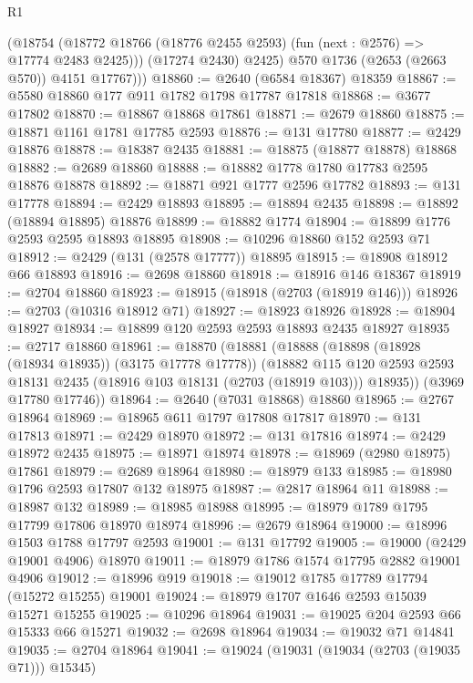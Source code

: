 \begin{lexlean}{R1}
\begin{coremodule}
            (@18754 (@18772 @18766 (@18776 @2455 @2593) (fun (next : @2576) => @17774 @2483 @2425)))
            (@17274 @2430)
            @2425)
          @570
          @1736
          (@2653 (@2663 @570))
          @4151
          @17767)))
@18860 := @2640 (@6584 @18367) @18359
@18867 := @5580 @18860 @177 @911 @1782 @1798 @17787 @17818
@18868 := @3677 @17802
@18870 := @18867 @18868 @17861
@18871 := @2679 @18860
@18875 := @18871 @1161 @1781 @17785 @2593
@18876 := @131 @17780
@18877 := @2429 @18876
@18878 := @18387 @2435
@18881 := @18875 (@18877 @18878) @18868
@18882 := @2689 @18860
@18888 := @18882 @1778 @1780 @17783 @2595 @18876 @18878
@18892 := @18871 @921 @1777 @2596 @17782
@18893 := @131 @17778
@18894 := @2429 @18893
@18895 := @18894 @2435
@18898 := @18892 (@18894 @18895) @18876
@18899 := @18882 @1774
@18904 := @18899 @1776 @2593 @2595 @18893 @18895
@18908 := @10296 @18860 @152 @2593 @71
@18912 := @2429 (@131 (@2578 @17777)) @18895
@18915 := @18908 @18912 @66 @18893
@18916 := @2698 @18860
@18918 := @18916 @146 @18367
@18919 := @2704 @18860
@18923 := @18915 (@18918 (@2703 (@18919 @146)))
@18926 := @2703 (@10316 @18912 @71)
@18927 := @18923 @18926
@18928 := @18904 @18927
@18934 := @18899 @120 @2593 @2593 @18893 @2435 @18927
@18935 := @2717 @18860
@18961 := @18870
    (@18881
      (@18888
        (@18898 (@18928 (@18934 @18935)) (@3175 @17778 @17778))
        (@18882
          @115
          @120
          @2593
          @2593
          @18131
          @2435
          (@18916 @103 @18131 (@2703 (@18919 @103)))
          @18935))
      (@3969 @17780 @17746))
@18964 := @2640 (@7031 @18868) @18860
@18965 := @2767 @18964
@18969 := @18965 @611 @1797 @17808 @17817
@18970 := @131 @17813
@18971 := @2429 @18970
@18972 := @131 @17816
@18974 := @2429 @18972 @2435
@18975 := @18971 @18974
@18978 := @18969 (@2980 @18975) @17861
@18979 := @2689 @18964
@18980 := @18979 @133
@18985 := @18980 @1796 @2593 @17807 @132 @18975
@18987 := @2817 @18964 @11
@18988 := @18987 @132
@18989 := @18985 @18988
@18995 := @18979 @1789 @1795 @17799 @17806 @18970 @18974
@18996 := @2679 @18964
@19000 := @18996 @1503 @1788 @17797 @2593
@19001 := @131 @17792
@19005 := @19000 (@2429 @19001 @4906) @18970
@19011 := @18979 @1786 @1574 @17795 @2882 @19001 @4906
@19012 := @18996 @919
@19018 := @19012 @1785 @17789 @17794 (@15272 @15255) @19001
@19024 := @18979 @1707 @1646 @2593 @15039 @15271 @15255
@19025 := @10296 @18964
@19031 := @19025 @204 @2593 @66 @15333 @66 @15271
@19032 := @2698 @18964
@19034 := @19032 @71 @14841
@19035 := @2704 @18964
@19041 := @19024 (@19031 (@19034 (@2703 (@19035 @71))) @15345)

\end{coremodule}
\end{lexlean}
